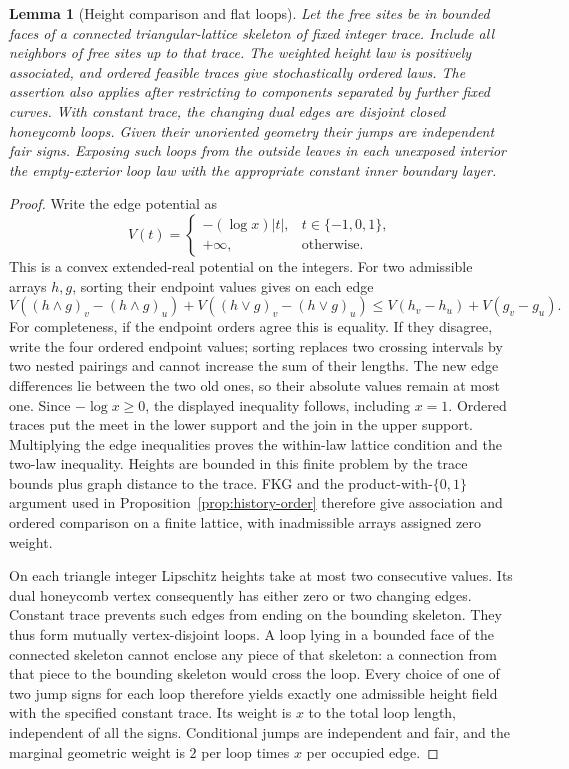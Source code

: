 \documentclass[11pt]{article}
\newtheorem{lemma}[theorem]{Lemma}
\theoremstyle{definition}
\theoremstyle{remark}
\numberwithin{equation}{section}
\begin{document}
\begin{lemma}[Height comparison and flat loops]\label{lem:height-order}
Let the free sites be in bounded faces of a connected triangular-lattice
skeleton of fixed integer trace. Include all neighbors of free sites up
to that trace. The weighted height law is positively associated, and
ordered feasible traces give stochastically ordered laws. The assertion
also applies after restricting to components separated by further fixed
curves. With constant trace, the changing dual edges are disjoint closed
honeycomb loops. Given their unoriented geometry their jumps are
independent fair signs. Exposing such loops from the outside leaves in
each unexposed interior the empty-exterior loop law with the appropriate
constant inner boundary layer.
\end{lemma}
\begin{proof}
Write the edge potential as
\[
 V(t)=\begin{cases}-(\log x)|t|,&t\in\{-1,0,1\},\\
                    +\infty,&\text{otherwise}.
       \end{cases}
\]
This is a convex extended-real potential on the integers. For two
admissible arrays $h,g$, sorting their endpoint values gives on each edge
\[
 V((h\wedge g)_v-(h\wedge g)_u)
 +V((h\vee g)_v-(h\vee g)_u)
 \le V(h_v-h_u)+V(g_v-g_u).
\]
For completeness, if the endpoint orders agree this is equality. If
they disagree, write the four ordered endpoint values; sorting replaces
two crossing intervals by two nested pairings and cannot increase the
sum of their lengths. The new edge differences lie between the two old
ones, so their absolute values remain at most one. Since $-\log x\ge0$,
the displayed inequality follows, including $x=1$. Ordered traces put
the meet in the lower support and the join in the upper support.
Multiplying the edge inequalities proves the within-law lattice
condition and the two-law inequality. Heights are bounded in this finite
problem by the trace bounds plus graph distance to the trace. FKG and
the product-with-$\{0,1\}$ argument used in
Proposition~\ref{prop:history-order} therefore give association and
ordered comparison on a finite lattice, with inadmissible arrays assigned
zero weight.

On each triangle integer Lipschitz heights take at most two consecutive
values. Its dual honeycomb vertex consequently has either zero or two
changing edges. Constant trace prevents such edges from ending on the
bounding skeleton. They thus form mutually vertex-disjoint loops. A
loop lying in a bounded face of the connected skeleton cannot enclose
any piece of that skeleton: a connection from that piece to the bounding
skeleton would cross the loop. Every choice of one of two jump signs
for each loop therefore yields exactly one admissible height field with
the specified constant trace. Its weight is $x$ to the total loop length,
independent of all the signs. Conditional jumps are independent and fair,
and the marginal geometric weight is $2$ per loop times $x$ per occupied
edge.


\end{proof}
\end{document}
